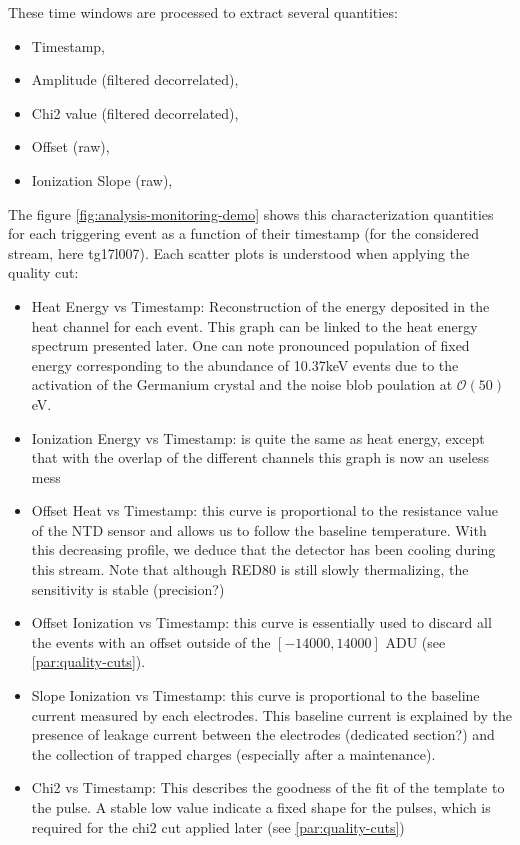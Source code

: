 These time windows are processed to extract several quantities:
\begin{itemize}
	\item Timestamp,
	\item Amplitude (filtered decorrelated),
	\item Chi2 value (filtered decorrelated),
	\item Offset (raw),
	\item Ionization Slope (raw),
\end{itemize}
The figure \ref{fig:analysis-monitoring-demo} shows this characterization quantities for each triggering event as a function of their timestamp (for the considered stream, here tg17l007). Each scatter plots is understood when applying the quality cut:
\begin{itemize}
	\item Heat Energy vs Timestamp: Reconstruction of the energy deposited in the heat channel for each event. This graph can be linked to the heat energy spectrum presented later. One can note pronounced population of fixed energy corresponding to the abundance of 10.37keV events due to the activation of the Germanium crystal and the noise blob poulation at $\mathcal{O}(50)$eV.
	\item Ionization Energy vs Timestamp: is quite the same as heat energy, except that with the overlap of the different channels this graph is now an useless mess
	\item Offset Heat vs Timestamp: this curve is proportional to the resistance value of the NTD sensor and allows us to follow the baseline temperature. With this decreasing profile, we deduce that the detector has been cooling during this stream. Note that although RED80 is still slowly thermalizing, the sensitivity is stable (precision?)
	\item Offset Ionization vs Timestamp: this curve is essentially used to discard all the events with an offset outside of the $[-14000, 14000]$ ADU (see \ref{par:quality-cuts}).
	\item Slope Ionization vs Timestamp: this curve is proportional to the baseline current measured by each electrodes. This baseline current is explained by the presence of leakage current between the electrodes (dedicated section?) and the collection of trapped charges (especially after a maintenance).
	\item Chi2 vs Timestamp: This describes the goodness of the fit of the template to the pulse. A stable low value indicate a fixed shape for the pulses, which is required for the chi2 cut applied later (see \ref{par:quality-cuts})
\end{itemize}

